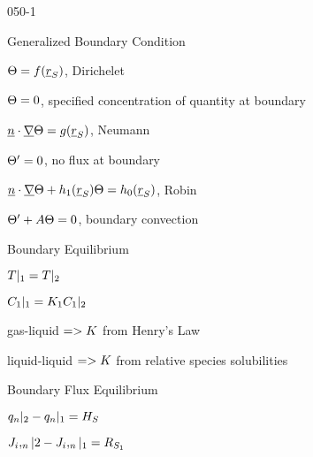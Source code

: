 \begin{mitframe}{050-1}
\begin{listone}
	\item Generalized Boundary Condition
    	\begin{listtwo}
        	\item $\dimltemp=\fug(\uline{\pos}_{\entropy})$,  Dirichelet
            \begin{listthree}
            	\item $\dimltemp=0$, specified concentration of quantity at boundary
            \end{listthree}
        	\item $\uline{n}\cdot\gradop\dimltemp=\grav(\uline{\pos}_{\entropy})$, Neumann
          	\begin{listthree}
				\item $\dimltemp'=0$, no flux at boundary
\end{listthree}  
        	\item $\uline{n}\cdot\gradop\dimltemp+\heattranscoeff_1(\uline{\pos}_{\entropy})\dimltemp=\heattranscoeff_0(\uline{\pos}_{\entropy})$, Robin
        	\begin{listtwo}
            	\item $\dimltemp'+\helmholtz\dimltemp=0$, boundary convection
            \end{listtwo}            
        \end{listtwo}
	\item Boundary Equilibrium
    	\begin{listtwo}
        	\item $\Temp|_1=\Temp|_2$
            \item $\conc_1|_1=\dilfac_1\conc_1|_2$
            	\begin{listthree}
                	\item gas-liquid $=>\dilfac$ from Henry's Law
                    \item liquid-liquid $=>\dilfac$ from relative species solubilities
                     \end{listthree}
           \end{listtwo}
	\item Boundary Flux Equilibrium
    	\begin{listtwo}
        	\item $\heatflux_n|_2-\heatflux_n|_1=\enthalpy_{\entropy}$
            \item $\molspecflux,_n|2-\molspecflux,_n|_1=\gasconst_{\entropy_{1}}$

\end{listtwo}
\end{listone}
\end{mitframe}
